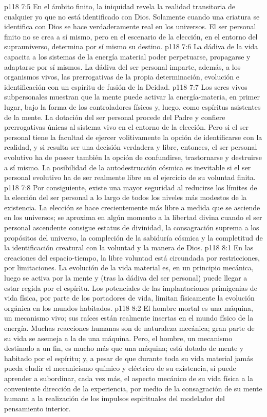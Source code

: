 \vs p118 7:5 En el ámbito finito, la iniquidad revela la realidad transitoria de cualquier yo que no está identificado con Dios. Solamente cuando una criatura se identifica con Dios se hace verdaderamente real en los universos. El ser personal finito no se crea a sí mismo, pero en el escenario de la elección, en el entorno del suprauniverso, determina por sí mismo su destino.
\vs p118 7:6 \pc La dádiva de la vida capacita a los sistemas de la energía material poder perpetuarse, propagarse y adaptarse por sí mismos. La dádiva del ser personal imparte, además, a los organismos vivos, las prerrogativas de la propia determinación, evolución e identificación con un espíritu de fusión de la Deidad.
\vs p118 7:7 Los seres vivos subpersonales muestran que la mente puede activar la energía\hyp{}materia, en primer lugar, bajo la forma de los controladores físicos y, luego, como espíritus asistentes de la mente. La dotación del ser personal procede del Padre y confiere prerrogativas únicas al sistema vivo en el entorno de la elección. Pero si el ser personal tiene la facultad de ejercer volitivamente la opción de identificarse con la realidad, y si resulta ser una decisión verdadera y libre, entonces, el ser personal evolutivo ha de poseer también la opción de confundirse, trastornarse y destruirse a sí mismo. La posibilidad de la autodestrucción cósmica es inevitable si el ser personal evolutivo ha de ser realmente libre en el ejercicio de su voluntad finita.
\vs p118 7:8 Por consiguiente, existe una mayor seguridad al reducirse los límites de la elección del ser personal a lo largo de todos los niveles más modestos de la existencia. La elección se hace crecientemente más libre a medida que se asciende en los universos; se aproxima en algún momento a la libertad divina cuando el ser personal ascendente consigue estatus de divinidad, la consagración suprema a los propósitos del universo, la compleción de la sabiduría cósmica y la completitud de la identificación creatural con la voluntad y la manera de Dios.
\vs p118 8:1 En las creaciones del espacio\hyp{}tiempo, la libre voluntad está circundada por restricciones, por limitaciones. La evolución de la vida material es, en un principio mecánica, luego se activa por la mente y (tras la dádiva del ser personal) puede llegar a estar regida por el espíritu. Los potenciales de las implantaciones primigenias de vida física, por parte de los portadores de vida, limitan físicamente la evolución orgánica en los mundos habitados.
\vs p118 8:2 El hombre mortal es una máquina, un mecanismo vivo; sus raíces están realmente insertas en el mundo físico de la energía. Muchas reacciones humanas son de naturaleza mecánica; gran parte de su vida se asemeja a la de una máquina. Pero, el hombre, un mecanismo destinado a un fin, es mucho más que una máquina; está dotado de mente y habitado por el espíritu; y, a pesar de que durante toda su vida material jamás pueda eludir el mecanicismo químico y eléctrico de su existencia, sí puede aprender a subordinar, cada vez más, el aspecto mecánico de su vida física a la conveniente dirección de la experiencia, por medio de la consagración de su mente humana a la realización de los impulsos espirituales del modelador del pensamiento interior.
